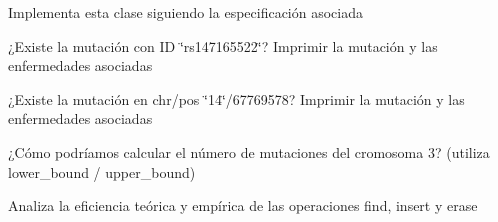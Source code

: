 
\begin{DoxyRefList}
\item[\label{todo__todo000005}%
\hypertarget{todo__todo000005}{}%
Clase \hyperlink{classconjunto}{conjunto} ]Implementa esta clase siguiendo la especificación asociada  
\item[\label{todo__todo000001}%
\hypertarget{todo__todo000001}{}%
Miembro \hyperlink{principal_8cpp_a0ddf1224851353fc92bfbff6f499fa97}{main} (int argc, char $\ast$argv\mbox{[}\mbox{]})]¿\+Existe la mutación con ID \char`\"{}rs147165522\char`\"{}? Imprimir la mutación y las enfermedades asociadas 

¿\+Existe la mutación en chr/pos \char`\"{}14\char`\"{}/67769578? Imprimir la mutación y las enfermedades asociadas 

¿\+Cómo podríamos calcular el número de mutaciones del cromosoma 3? (utiliza lower\+\_\+bound / upper\+\_\+bound) 

Analiza la eficiencia teórica y empírica de las operaciones find, insert y erase 
\end{DoxyRefList}